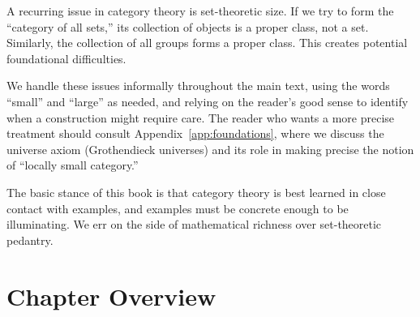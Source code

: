 A recurring issue in category theory is set-theoretic size. If we try to form the ``category of all sets,'' its collection of objects is a proper class, not a set. Similarly, the collection of all groups forms a proper class. This creates potential foundational difficulties.

We handle these issues informally throughout the main text, using the words ``small'' and ``large'' as needed, and relying on the reader's good sense to identify when a construction might require care. The reader who wants a more precise treatment should consult Appendix~\ref{app:foundations}, where we discuss the universe axiom (Grothendieck universes) and its role in making precise the notion of ``locally small category.''

The basic stance of this book is that category theory is best learned in close contact with examples, and examples must be concrete enough to be illuminating. We err on the side of mathematical richness over set-theoretic pedantry.

\section{Chapter Overview}


